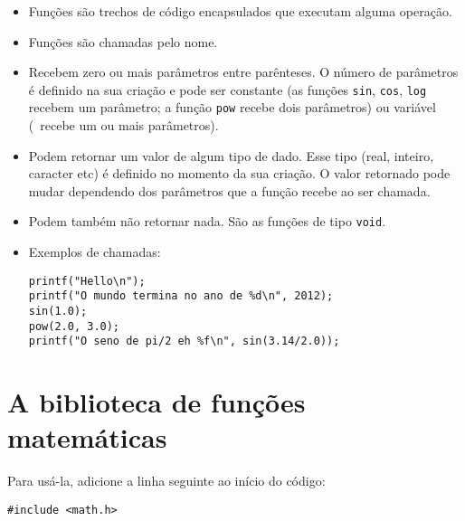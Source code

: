 \begin{itemize}

\item Funções são trechos de código encapsulados que executam alguma operação.
\item Funções são chamadas pelo nome.
\item Recebem zero ou mais parâmetros entre parênteses. O número de parâmetros é definido na sua criação e pode ser constante 
(as funções {\tt sin}, {\tt cos}, {\tt log} recebem um parâmetro; 
a função {\tt pow} recebe dois parâmetros)
ou variável (\PRINTF\ recebe um ou mais parâmetros).
\item Podem retornar um valor de algum tipo de dado. Esse tipo (real, inteiro, caracter etc) é definido no momento da sua criação. O valor retornado pode mudar dependendo dos parâmetros que a função recebe ao ser chamada.
\item Podem também não retornar nada. São as funções de tipo {\tt void}.

\item Exemplos de chamadas:

\begin{lstlisting}
printf("Hello\n");
printf("O mundo termina no ano de %d\n", 2012);
sin(1.0);
pow(2.0, 3.0);
printf("O seno de pi/2 eh %f\n", sin(3.14/2.0));
\end{lstlisting}

\end{itemize}


\section{A biblioteca de funções matemáticas}

Para usá-la, adicione a linha seguinte ao início do código:

\begin{lstlisting}
#include <math.h>
\end{lstlisting}

